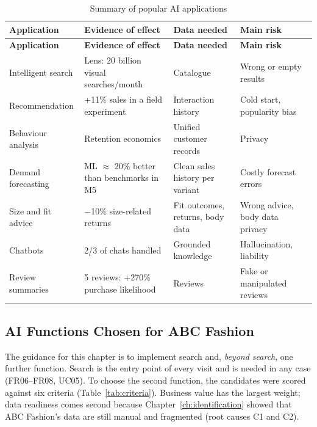 \begin{xltabular}{\textwidth}{@{}L{2.7cm} L{3.2cm} L{2.8cm} Y@{}}
\caption{Summary of popular AI applications}\label{tab:aisummary}\\
\toprule
\textbf{Application} & \textbf{Evidence of effect} & \textbf{Data needed} & \textbf{Main risk} \\ \midrule
\endfirsthead
\toprule
\textbf{Application} & \textbf{Evidence of effect} & \textbf{Data needed} & \textbf{Main risk} \\ \midrule
\endhead
\bottomrule
\endlastfoot
Intelligent search & Lens: 20 billion visual searches/month \cite{lens2024} & Catalogue & Wrong or empty results \\
Recommendation & +11\% sales in a field experiment \cite{kumar2019} & Interaction history & Cold start, popularity bias \\
Behaviour analysis & Retention economics \cite{reichheld2000} & Unified customer records & Privacy \\
Demand forecasting & ML $\approx$ 20\% better than benchmarks in M5 \cite{wellens2022} & Clean sales history per variant & Costly forecast errors \\
Size and fit advice & $-$10\% size-related returns \cite{zalando_size} & Fit outcomes, returns, body data & Wrong advice, body data privacy \\
Chatbots & 2/3 of chats handled \cite{klarna2024} & Grounded knowledge & Hallucination, liability \cite{aircanada2024} \\
Review summaries & 5 reviews: +270\% purchase likelihood \cite{spiegel2017} & Reviews & Fake or manipulated reviews \\
\end{xltabular}

\subsection{AI Functions Chosen for ABC Fashion}
\label{sec:aiselect}
The guidance for this chapter is to implement search and, \emph{beyond search}, one further function. Search is the entry point of every visit and is needed in any case (FR06--FR08, UC05). To choose the second function, the candidates were scored against six criteria (Table~\ref{tab:criteria}). Business value has the largest weight; data readiness comes second because Chapter~\ref{ch:identification} showed that ABC Fashion's data are still manual and fragmented (root causes C1 and C2).

